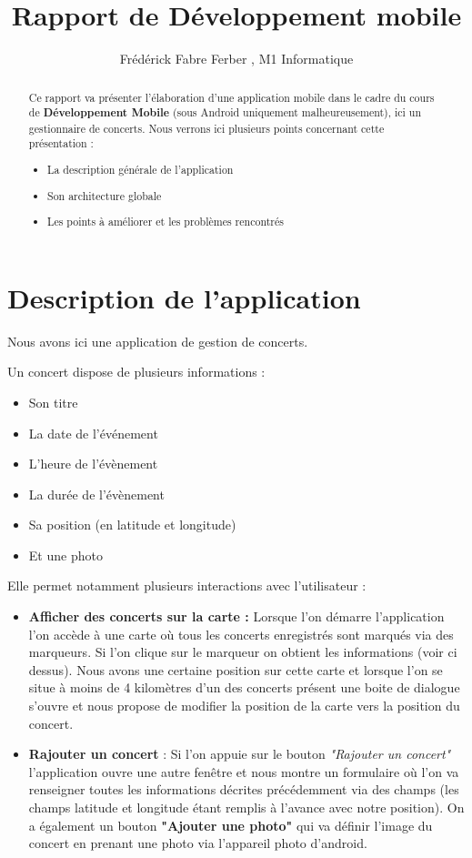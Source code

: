 \documentclass{article}
\title{Rapport de Développement mobile}
\author{Frédérick Fabre Ferber , M1 Informatique}
\begin{document}
\maketitle

\begin{abstract}
Ce rapport va présenter l'élaboration d'une application mobile dans le cadre du cours de \textbf{Développement Mobile} (sous Android uniquement malheureusement), ici un gestionnaire de concerts.
 Nous verrons ici plusieurs points concernant cette présentation :
\begin{itemize}
\item La description générale de l'application
\item Son architecture globale
\item Les points à améliorer et les problèmes rencontrés
\end{itemize}
\end{abstract}

\section{Description de l'application}
\label{section:Description de l'application}

Nous avons ici une application de gestion de concerts. 

Un concert dispose de plusieurs informations :
\begin{itemize}
\item Son titre 
\item La date de l’événement
\item L'heure de l'évènement 
\item La durée de l'évènement
\item Sa position (en latitude et longitude)
\item Et une photo
\end{itemize}

Elle permet notamment plusieurs interactions avec l'utilisateur : 
\begin{itemize}
\item \textbf{Afficher des concerts sur la carte : } Lorsque l'on démarre l'application l'on accède à une carte où tous les concerts enregistrés sont marqués via des marqueurs. Si l'on clique sur le marqueur on obtient les informations (voir ci dessus). Nous avons une certaine position sur cette carte et lorsque l'on se situe à moins de 4 kilomètres d'un des concerts présent une boite de dialogue s'ouvre et nous propose de modifier la position de la carte vers la position du concert.
\item \textbf{Rajouter un concert} : Si l'on appuie sur le bouton \textit{"Rajouter un concert"} l'application ouvre une autre fenêtre et nous montre un formulaire où l'on va renseigner toutes les informations décrites précédemment via des champs (les champs latitude et longitude étant remplis à l'avance avec notre position). On a également un bouton \textbf{"Ajouter une photo"} qui va définir l'image du concert en prenant une photo via l'appareil photo d'android. 
\end{itemize}
\end{document}
